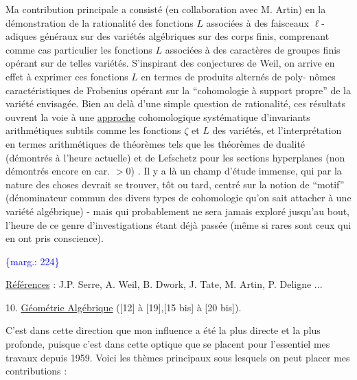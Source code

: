 \documentclass[11pt]{article}
\newcommand{\scanpage}[1]{\par\bigskip\noindent{\small\sffamily[scan #1]}\par}
\newcommand{\mspage}[1]{{\small\sffamily[p.\,#1]}}
\newcommand{\margin}[1]{\textcolor{blue}{\{\textsf{marg.:} #1\}}}
\newcommand{\uline}[1]{\underline{#1}}
\begin{document}
Ma contribution principale a consisté (en
collaboration avec M. Artin) en la démonstration de
la rationalité des fonctions $L$ associées à des
faisceaux $\ell$-adiques généraux sur des variétés algébriques
sur des corps finis, comprenant comme cas particulier
les fonctions $L$ associées à des caractères de groupes
finis opérant sur de telles variétés. S'inspirant des
conjectures de Weil, on arrive en effet à exprimer ces
fonctions $L$ en termes de produits alternés de poly-%
nômes caractéristiques de Frobenius opérant sur la
``cohomologie à support propre'' de la variété envisagée.
Bien au delà d'une simple question de rationalité, ces
résultats ouvrent la voie à une \uline{approche} cohomologique
systématique d'invariants arithmétiques subtils comme
les fonctions $\zeta$ et $L$ des variétés, et l'interprétation
en termes arithmétiques de théorèmes tels que les
théorèmes de dualité (démontrés à l'heure actuelle) et
de Lefschetz pour les sections hyperplanes (non démontrés
encore en car. $> 0$) . Il y a là un champ d'étude immense,
qui par la nature des choses devrait se trouver, tôt
ou tard, centré sur la notion de ``motif'' (dénominateur
commun des divers types de cohomologie qu'on sait attacher
à une variété algébrique) - mais qui probablement ne
sera jamais exploré jusqu'au bout, l'heure de ce genre
d'investigations étant déjà passée (même si rares sont
ceux qui en ont pris conscience).

\margin{224}

\clearpage
\scanpage{119/225}
\mspage{. 12 .}

\uline{Références} : J.P. Serre, A. Weil, B. Dwork, J. Tate,
M. Artin, P. Deligne ...

10. \uline{Géométrie Algébrique} ([12] à [19],[15 bis] à [20 bis]).

C'est dans cette direction que mon influence
a été la plus directe et la plus profonde, puisque
c'est dans cette optique que se placent pour l'essentiel
mes travaux depuis 1959. Voici les thèmes principaux
sous lesquels on peut placer mes contributions :
\end{document}
